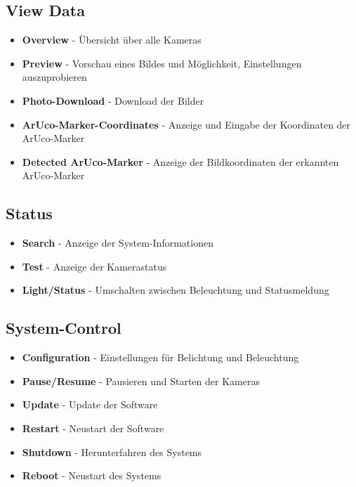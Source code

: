 \documentclass[./00PhotoBox.tex]{subfiles}
\begin{document}
\subsection{\foreignlanguage{british}{View Data}}
\begin{itemize}
    \item \textbf{\foreignlanguage{british}{Overview}} - Übersicht über alle Kameras
    \item \textbf{\foreignlanguage{british}{Preview}} - Vorschau eines Bildes und Möglichkeit, Einstellungen auszuprobieren
    \item \textbf{\foreignlanguage{british}{Photo-Download}} - Download der Bilder
    \item \textbf{\foreignlanguage{british}{ArUco-Marker-Coordinates}} - Anzeige und Eingabe der Koordinaten der ArUco-Marker
    \item \textbf{\foreignlanguage{british}{Detected ArUco-Marker}} - Anzeige der Bildkoordinaten der erkannten ArUco-Marker
\end{itemize}

\subsection{\foreignlanguage{british}{Status}}
\begin{itemize}
    \item \textbf{\foreignlanguage{british}{Search}} - Anzeige der System-Informationen
    \item \textbf{\foreignlanguage{british}{Test}} - Anzeige der Kamerastatus
    \item \textbf{\foreignlanguage{british}{Light/Status}} - Umschalten zwischen Beleuchtung und Statusmeldung
\end{itemize}

\subsection{\foreignlanguage{british}{System-Control}}
\begin{itemize}
    \item \textbf{\foreignlanguage{british}{Configuration}} - Einstellungen für Belichtung und Beleuchtung
    \item \textbf{\foreignlanguage{british}{Pause/Resume}} - Pausieren und Starten der Kameras
    \item \textbf{\foreignlanguage{british}{Update}} - Update der Software
    \item \textbf{\foreignlanguage{british}{Restart}} - Neustart der Software
    \item \textbf{\foreignlanguage{british}{Shutdown}} - Herunterfahren des Systems
    \item \textbf{\foreignlanguage{british}{Reboot}} - Neustart des Systems
\end{itemize}
\end{document}
